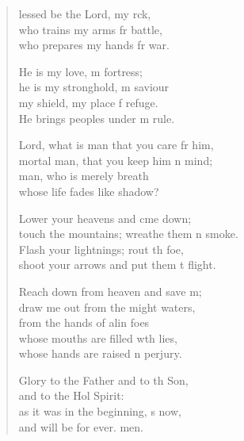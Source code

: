 \settowidth{\versewidth}{touch the mountains; wreathe them in smoke.}
\begin{verse}%
  \begin{patverse}
lessed be the Lord, my rck,\Flex\\
    who trains my arms fr battle,\Med\\
    who prepares my hands fr war.

He is my love, m fortress;\Med\\
    he is my stronghold, m saviour\\
my shield, my place f refuge.\Med\\
    He brings peoples under m rule.

Lord, what is man that you care fr him,\Med\\
    mortal man, that you keep him \pointup{\i}n mind;\\
man, who is merely  breath\Med\\
    whose life fades like  shadow?

Lower your heavens and cme down;\Med\\
    touch the mountains; wreathe them \pointup{\i}n smoke.\\
Flash your lightnings; rout th foe,\Med\\
    shoot your arrows and put them t flight.

Reach down from heaven and save m;\Flex\\
    draw me out from the might waters,\Med\\
    from the hands of alin foes\\
whose mouths are filled w\pointup{\i}th lies,\Med\\
    whose hands are raised \pointup{\i}n perjury.

Glory to the Father and to th Son,\Med\\
    and to the Hol Spirit:\\
as it was in the beginning, \pointup{\i}s now,\Med\\
    and will be for ever. men.
  \end{patverse}
\end{verse}
